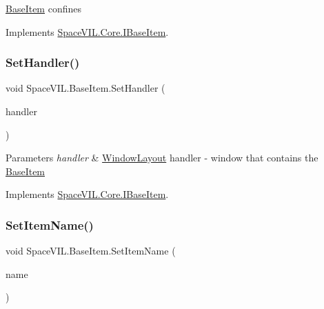 \mbox{\hyperlink{class_space_v_i_l_1_1_base_item}{Base\+Item}} confines 



Implements \mbox{\hyperlink{interface_space_v_i_l_1_1_core_1_1_i_base_item}{Space\+V\+I\+L.\+Core.\+I\+Base\+Item}}.

\mbox{\label{class_space_v_i_l_1_1_base_item_af62e189b018fffc486961909ab4671cb}} 
\subsubsection{\texorpdfstring{Set\+Handler()}{SetHandler()}}
{\footnotesize\ttfamily void Space\+V\+I\+L.\+Base\+Item.\+Set\+Handler (\begin{DoxyParamCaption}\item[{\mbox{\hyperlink{class_space_v_i_l_1_1_window_layout}{Window\+Layout}}}]{handler }\end{DoxyParamCaption})\hspace{0.3cm}{\ttfamily [inline]}}


\begin{DoxyParams}{Parameters}
{\em handler} & \mbox{\hyperlink{class_space_v_i_l_1_1_window_layout}{Window\+Layout}} handler -\/ window that contains the \mbox{\hyperlink{class_space_v_i_l_1_1_base_item}{Base\+Item}} \\
\hline
\end{DoxyParams}


Implements \mbox{\hyperlink{interface_space_v_i_l_1_1_core_1_1_i_base_item}{Space\+V\+I\+L.\+Core.\+I\+Base\+Item}}.

\mbox{\label{class_space_v_i_l_1_1_base_item_a10bc09b650b0e0ed08536b402beb6813}} 
\subsubsection{\texorpdfstring{Set\+Item\+Name()}{SetItemName()}}
{\footnotesize\ttfamily void Space\+V\+I\+L.\+Base\+Item.\+Set\+Item\+Name (\begin{DoxyParamCaption}\item[{string}]{name }\end{DoxyParamCaption})\hspace{0.3cm}{\ttfamily [inline]}}



